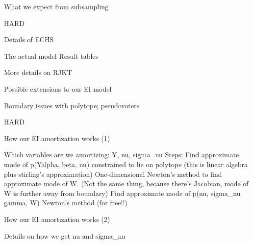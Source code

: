 \documentclass[
  ignorenonframetext,
]{beamer}
\begin{document}
\begin{frame}{What we expect from subsampling}
\protect\hypertarget{what-we-expect-from-subsampling}{}

HARD

\end{frame}

\begin{frame}{Details of ECHS}
\protect\hypertarget{details-of-echs}{}

The actual model Result tables

\end{frame}

\begin{frame}{More details on RJKT}
\protect\hypertarget{more-details-on-rjkt}{}

\end{frame}

\begin{frame}{Possible extensions to our EI model}
\protect\hypertarget{possible-extensions-to-our-ei-model}{}

\end{frame}

\begin{frame}{Boundary issues with polytope; pseudovoters}
\protect\hypertarget{boundary-issues-with-polytope-pseudovoters}{}

HARD

\end{frame}

\begin{frame}{How our EI amortization works (1)}
\protect\hypertarget{how-our-ei-amortization-works-1}{}

Which variables are we amortizing: Y, nu, sigma\_nu Steps: Find
approximate mode of p(Y\textbar{}alpha, beta, nu) constrained to lie on
polytope (this is linear algebra plus stirling's approximation)
One-dimensional Newton's method to find approximate mode of W. (Not the
same thing, because there's Jacobian, mode of W is further away from
boundary) Find approximate mode of p(nu, sigma\_nu\textbar{} gamma, W)
Newton's method (for free!!)

\end{frame}

\begin{frame}{How our EI amortization works (2)}
\protect\hypertarget{how-our-ei-amortization-works-2}{}

Details on how we get nu and sigma\_nu

\end{frame}
\end{document}
